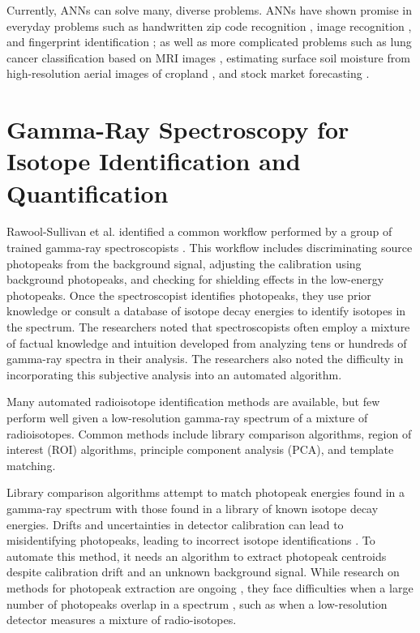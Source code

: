 Currently, ANNs can solve many, diverse problems. ANNs have shown promise in everyday problems such as handwritten zip code recognition \cite{LeCun1989}, image recognition \cite{Krizhevsky2012}, and fingerprint identification \cite{Jeyanthia2015}; as well as more complicated problems such as lung cancer classification based on MRI images \cite{Selvakumari2016}, estimating surface soil moisture from high-resolution aerial images of cropland \cite{Hassan-Esfahani2015}, and stock market forecasting \cite{Rababaah2015}.


\section{Gamma-Ray Spectroscopy for Isotope Identification and Quantification}

Rawool-Sullivan et al. identified a common workflow performed by a group of trained gamma-ray spectroscopists \cite{Sullivan2010}. This workflow includes discriminating source photopeaks from the background signal, adjusting the calibration using background photopeaks, and checking for shielding effects in the low-energy photopeaks. Once the spectroscopist identifies photopeaks, they use prior knowledge or consult a database of isotope decay energies to identify isotopes in the spectrum. The researchers noted that spectroscopists often employ a mixture of factual knowledge and intuition developed from analyzing tens or hundreds of gamma-ray spectra in their analysis. The researchers also noted the difficulty in incorporating this subjective analysis into an automated algorithm.

Many automated radioisotope identification methods are available, but few perform well given a low-resolution gamma-ray spectrum of a mixture of radioisotopes. Common methods include library comparison algorithms, region of interest (ROI) algorithms, principle component analysis (PCA), and template matching.

Library comparison algorithms attempt to match photopeak energies found in a gamma-ray spectrum with those found in a library of known isotope decay energies. Drifts and uncertainties in detector calibration can lead to misidentifying photopeaks, leading to incorrect isotope identifications \cite{burr2009}. To automate this method, it needs an algorithm to extract photopeak centroids despite calibration drift and an unknown background signal. While research on methods for photopeak extraction are ongoing \cite{mariscotti1967,DELOTTO1977,GARDNER2011}, they face difficulties when a large number of photopeaks overlap in a spectrum \cite{xiong2015}, such as when a low-resolution detector measures a mixture of radio-isotopes.

